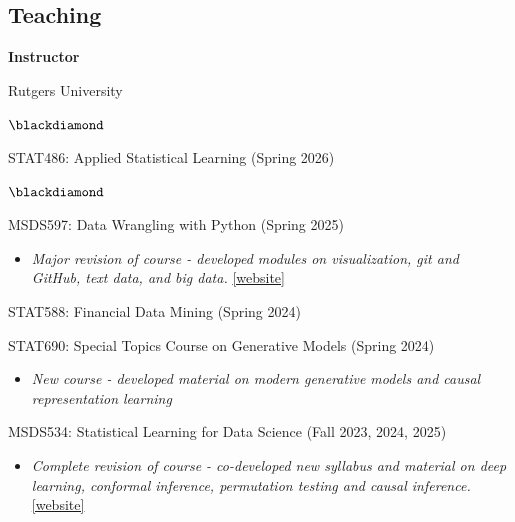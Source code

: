 \documentclass[margin,line]{res}
\newenvironment{list1}{
  \begin{list}{\ding{113}}{%
      \setlength{\itemsep}{8pt}
      \setlength{\parsep}{2pt} \setlength{\parskip}{2pt}
      \setlength{\topsep}{2pt} \setlength{\partopsep}{2pt} 
      \setlength{\leftmargin}{0.17in}}}{\end{list}}
\newenvironment{list2}{
  \begin{list}{\footnotesize$\blackdiamond$}{%
      \setlength{\itemsep}{8pt}
      \setlength{\parsep}{2pt} \setlength{\parskip}{2pt}
      \setlength{\topsep}{2pt} \setlength{\partopsep}{2pt} 
      \setlength{\leftmargin}{0.2in}
      }}{\end{list}}
\begin{document}
\begin{resume}
\section{\sc Teaching}
{\bf Instructor}
\begin{list1}
\item[] Rutgers University
\begin{list2}
\item STAT486: Applied Statistical Learning (Spring 2026)
\end{list2}
\begin{list2}
\item MSDS597: Data Wrangling with Python (Spring 2025)
\begin{itemize}
  \item {\it Major revision of course - developed modules on visualization, git and GitHub, text data, and big data.} \href{https://moran-teaching.github.io/msds597-website/}{[website]}
\end{itemize}
\item STAT588: Financial Data Mining (Spring 2024)
\item STAT690: Special Topics Course on Generative Models (Spring 2024)
\begin{itemize}
  \item {\it New course - developed material on modern generative models and causal representation learning}
\end{itemize} 
\item MSDS534: Statistical Learning for Data Science (Fall 2023, 2024, 2025)
\begin{itemize}
  \item {\it Complete revision of course - co-developed new syllabus and material on deep learning, conformal inference, permutation testing and causal inference.} \href{https://moran-teaching.github.io/msds534-website/}{[website]}
\end{itemize}
\end{list2}
\end{list1}




\end{resume}
\end{document}
